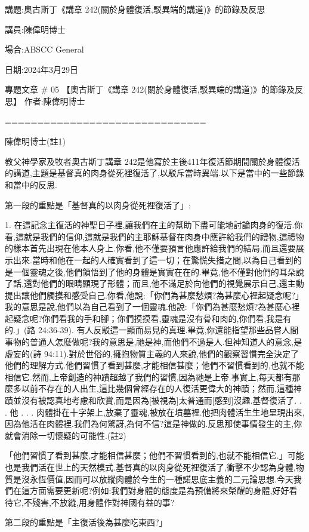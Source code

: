 \documentclass{book}
\begin{document}
講題:奧古斯丁《講章 242(關於身體復活,駁異端的講道)》的節錄及反思

講員:陳偉明博士

場合:ABSCC General

日期:2024年3月29日

專題文章 \# 05
【奧古斯丁《講章 242(關於身體復活,駁異端的講道)》的節錄及反思】
作者:陳偉明博士

===============================

陳偉明博士(註1)

教父神學家及牧者奧古斯丁講章 242是他寫於主後411年復活節期間關於身體復活的講道,主題是基督真的肉身從死裡復活了,以駁斥當時異端.以下是當中的一些節錄和當中的反思.

第一段的重點是「基督真的以肉身從死裡復活了」:

1. 在這記念主復活的神聖日子裡,讓我們在主的幫助下盡可能地討論肉身的復活.你看,這就是我們的信仰,這就是我們的主耶穌基督在肉身中應許給我們的禮物,這禮物的樣本首先出現在他本人身上.你看,他不僅要預言他應許給我們的結局,而且還要展示出來.當時和他在一起的人確實看到了這一切；在驚慌失措之間,以為自己看到的是一個靈魂之後,他們領悟到了他的身體是實實在在的.畢竟,他不僅對他們的耳朵說了話,還對他們的眼睛顯現了形體；而且,他不滿足於向他們的視覺展示自己,還主動提出讓他們觸摸和感受自己.你看,他說:「你們為甚麼愁煩?為甚麼心裡起疑念呢?」我的意思是說,他們以為自己看到了一個靈魂.他說:「你們為甚麼愁煩?為甚麼心裡起疑念呢?你們看我的手和腳；你們摸摸看,靈魂是沒有骨和肉的,你們看,我是有的.」(路 24:36-39).
有人反駁這一顯而易見的真理.畢竟,你還能指望那些品嘗人間事物的普通人怎麼做呢?我的意思是,祂是神,而他們不過是人.但神知道人的意念,是虛妄的(詩 94:11).對於世俗的,擁抱物質主義的人來說,他們的觀察習慣完全決定了他們的理解方式.他們習慣了看到甚麼,才能相信甚麼；他們不習慣看到的,也就不能相信它.然而,上帝創造的神蹟超越了我們的習慣,因為祂是上帝.事實上,每天都有那麼多以前不存在的人出生,這比幾個曾經存在的人復活更偉大的神蹟；然而,這種神蹟並沒有被認真地考慮和欣賞,而是因為[被視為]太普通而[感到]沒趣.基督復活了. . . 他 . . . 肉體掛在十字架上,放棄了靈魂,被放在墳墓裡.他把肉體活生生地呈現出來,因為他活在肉體裡.我們為何驚訝,為何不信?這是神做的.反思那使事情發生的主,你就會消除一切懷疑的可能性.(註2)

「他們習慣了看到甚麼,才能相信甚麼；他們不習慣看到的,也就不能相信它.」可能也是我們活在世上的天然模式.基督真的以肉身從死裡復活了,衝擊不少認為身體,物質是沒永恆價值,因而可以放縱肉體於今生的一種諾思底主義的二元論思想.今天我們在這方面需要更新呢?例如:我們對身體的態度是為預備將來榮耀的身體,好好看待它,不殘害,不放縱,用身體作對神國有益的事?

第二段的重點是「主復活後為甚麼吃東西?」
\end{document}
